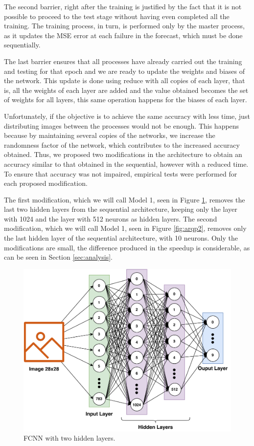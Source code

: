 \documentclass[conference]{IEEEtran}
\begin{document}
The second barrier, right after the training is justified by the fact that it is not possible to proceed to the test stage without having even completed all the training. The training process, in turn, is performed only by the master process, as it updates the MSE error at each failure in the forecast, which must be done sequentially.

The last barrier ensures that all processes have already carried out the training and testing for that epoch and we are ready to update the weights and biases of the network. This update is done using reduce with all copies of each layer, that is, all the weights of each layer are added and the value obtained becomes the set of weights for all layers, this same operation happens for the biases of each layer.

Unfortunately, if the objective is to achieve the same accuracy with less time, just distributing images between the processes would not be enough. This happens because by maintaining several copies of the networks, we increase the randomness factor of the network, which contributes to the increased accuracy obtained. Thus, we proposed two modifications in the architecture to obtain an accuracy similar to that obtained in the sequential, however with a reduced time. To ensure that accuracy was not impaired, empirical tests were performed for each proposed modification.

The first modification, which we will call Model 1, seen in Figure \ref{fig:arqp1}, removes the last two hidden layers from the sequential architecture, keeping only the layer with 1024 and the layer with 512 neurons as hidden layers. The second modification, which we will call Model 1, seen in Figure \ref{fig:arqp2}, removes only the last hidden layer of the sequential architecture, with 10 neurons. Only the modifications are small, the difference produced in the speedup is considerable, as can be seen in Section \ref{sec:analysis}.

\begin{figure}
    \centering
    \includegraphics[width=\columnwidth]{images/FCNN-P1.pdf}
    \caption{FCNN with two hidden layers.}
    \label{fig:arqp1}
\end{figure}
\end{document}
